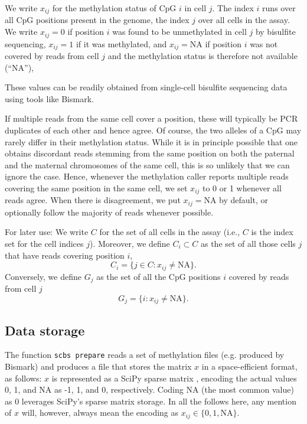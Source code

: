 \documentclass[twocolumn,10pt]{article}
\begin{document}
We write $x_{ij}$ for the methylation status of CpG $i$ in cell $j$.
The index $i$ runs over all CpG positions present in the genome, the index $j$ over all cells in the assay.
We write $x_{ij}=0$ if position $i$ was found to be unmethylated in cell $j$ by bisulfite sequencing, $x_{ij}=1$ if it was methylated, and $x_{ij}=\text{NA}$ if position $i$ was not covered by reads from cell $j$ and the methylation status is therefore not available (``NA''),

These values can be readily obtained from single-cell bisulfite sequencing data using tools like Bismark.

If multiple reads from the same cell cover a position, these will typically be PCR duplicates of each other and hence agree.
Of course, the two alleles of a CpG may rarely differ in their methylation status.
While it is in principle possible that one obtains discordant reads stemming from the same position on both the paternal and the maternal chromosomes of the same cell, this is so unlikely that we can ignore the case.
Hence, whenever the methylation caller reports multiple reads covering the same position in the same cell, we set $x_{ij}$ to 0 or 1 whenever all reads agree.
When there is disagreement, we put $x_{ij}=\text{NA}$ by default, or optionally follow the majority of reads whenever possible.

For later use: We write $C$ for the set of all cells in the assay (i.e., $C$ is the index set for the cell indices $j$).
Moreover,
we define $C_i\subset C$ as the set of all those cells $j$ that have reads covering position $i$,
$$ C_i=\{j\in C: x_{ij}\neq\text{NA}\}.$$
Conversely, we define $G_j$ as the set of all the CpG positions $i$ covered by reads from cell $j$ 
$$ G_j=\{i: x_{ij}\neq\text{NA}\}.$$

\subsection{Data storage}

The function \texttt{scbs prepare} reads a set of methylation files (e.g. produced by Bismark) and produces a file that stores the matrix $x$ in a space-efficient format, as follows: $x$ is represented as a SciPy sparse matrix \citep{SciPy}, encoding the actual values 0, 1, and NA as -1, 1, and 0, respectively.
Coding NA (the most common value) as 0 leverages SciPy's sparse matrix storage.
In all the follows here, any mention of $x$ will, however, always mean the encoding as $x_{ij}\in\{0,1,\text{NA}\}$.
\end{document}
